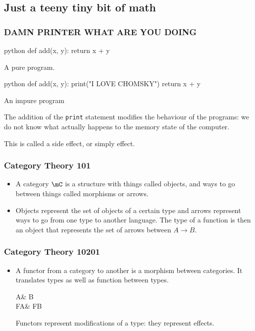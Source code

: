 \documentclass[math, english, info]{beamercours}
\begin{document}
\subsection{Just a teeny tiny bit of math}
\begin{frame}[fragile]
	\frametitle{DAMN PRINTER WHAT ARE YOU DOING}
	\begin{center}
		\begin{minipage}[b]{.45\textwidth}
			\begin{code}{python}
def add(x, y):
  return x + y
			\end{code}
			\centering
			A pure program.
		\end{minipage}
		\begin{minipage}[b]{.45\textwidth}
			\begin{code}{python}
def add(x, y):
  print("I LOVE CHOMSKY")
  return x + y
			\end{code}
			\centering
			An impure program
		\end{minipage}
	\end{center}
	\pause
	The addition of the \texttt{print} statement modifies the behaviour of the
	programs: we do not know what actually happens to the memory state of the
	computer.

	This is called a side effect, or simply effect.
\end{frame}

\begin{frame}
	\frametitle{Category Theory 101}
	\begin{itemize}
		\item A category $\mC$ is a structure with things called objects, and
		      ways to go between things called morphisms or arrows.
		      \pause
		\item Objects represent the set of objects of a certain type and arrows
		      represent ways to go from one type to another language.
		      The type of a function is then an object that represents the set
		      of arrows between $A \to B$.
	\end{itemize}
\end{frame}

\begin{frame}[fragile]
	\frametitle{Category Theory 10201}
	\begin{itemize}
		\item A functor from a category to another is a morphism between
		      categories.
		      It translates types as well as function between types.
		      \pause
		      \begin{category}
			      A\ar[r, "\phi"]\ar[d, "F"'] & B\ar[d, "F"] \\
			      FA\ar[r, "F\phi"'] & FB
		      \end{category}
		      Functors represent modifications of a type: they represent effects.
	\end{itemize}
\end{frame}
\end{document}
